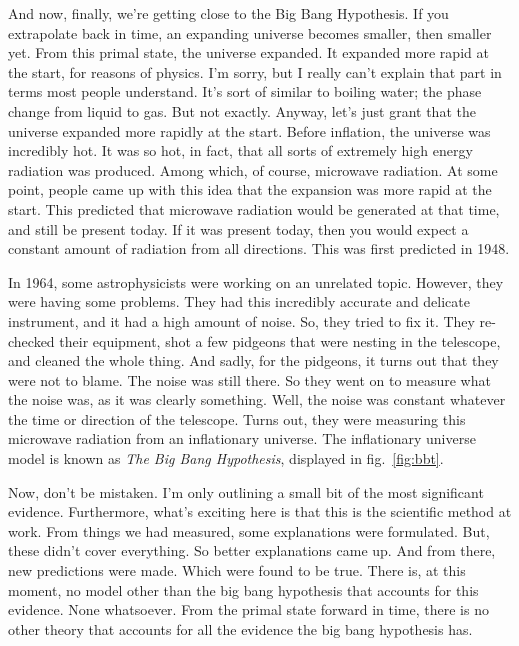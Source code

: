 \begin{multicols}{2}
And now, finally, we're getting close to the Big Bang Hypothesis. If you extrapolate back in time, an expanding universe becomes smaller, then smaller yet. From this primal state, the universe expanded. It expanded more rapid at the start, for reasons of physics. I'm sorry, but I really can't explain that part in terms most people understand. It's sort of similar to boiling water; the phase change from liquid to gas. But not exactly. Anyway, let's just grant that the universe expanded more rapidly at the start. Before inflation, the universe was incredibly hot. It was so hot, in fact, that all sorts of extremely high energy radiation was produced. Among which, of course, microwave radiation. At some point, people came up with this idea that the expansion was more rapid at the start. This predicted that microwave radiation would be generated at that time, and still be present today. If it was present today, then you would expect a constant amount of radiation from all directions. This was first predicted in 1948.


In 1964, some astrophysicists were working on an unrelated topic. However, they were having some problems. They had this incredibly accurate and delicate instrument, and it had a high amount of noise. So, they tried to fix it. They re-checked their equipment, shot a few pidgeons that were nesting in the telescope, and cleaned the whole thing. And sadly, for the pidgeons, it turns out that they were not to blame. The noise was still there. So they went on to measure what the noise was, as it was clearly something. Well, the noise was constant whatever the time or direction of the telescope. Turns out, they were measuring this microwave radiation from an inflationary universe. The inflationary universe model is known as \emph{The Big Bang Hypothesis}, displayed in fig.~\ref{fig:bbt}.

Now, don't be mistaken. I'm only outlining a small bit of the most significant evidence. Furthermore, what's exciting here is that this is the scientific method at work. From things we had measured, some explanations were formulated. But, these didn't cover everything. So better explanations came up. And from there, new predictions were made. Which were found to be true. There is, at this moment, no model other than the big bang hypothesis that accounts for this evidence. None whatsoever. From the primal state forward in time, there is no other theory that accounts for all the evidence the big bang hypothesis has.


\end{multicols}
